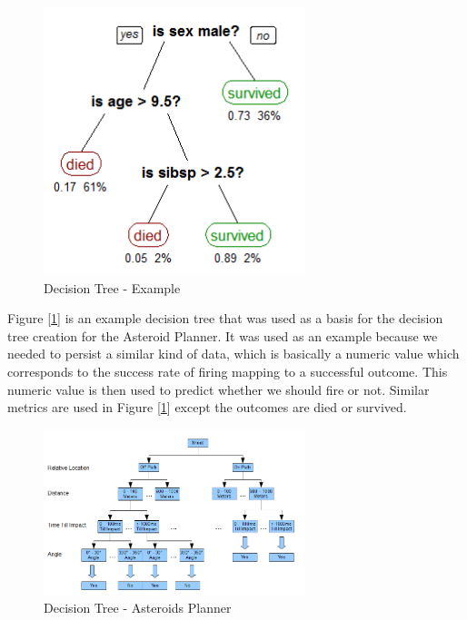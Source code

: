 \documentclass[10pt,draft,conference]{IEEEtran}
\begin{document}
\begin{figure}
\centering
\includegraphics[width=3.0in]{./CART_tree_titanic_survivors.png}
\caption{Decision Tree - Example}
\label{fig_decision_tree_example}
\end{figure}

Figure [\ref{fig_decision_tree_example}] is an example decision tree that was used as a basis for the decision tree creation for the Asteroid Planner\cite{wikiDecisionTreeLearning}.  It was used as an example because we needed to persist a similar kind of data, which is basically a numeric value which corresponds to the success rate of firing mapping to a successful outcome.  This numeric value is then used to predict whether we should fire or not.  Similar metrics are used in Figure [\ref{fig_decision_tree_example}] except the outcomes are died or survived.

\begin{figure}
\centering
\includegraphics[width=3.0in]{./DecisionTree.png}
\caption{Decision Tree - Asteroids Planner}
\label{fig_decision_tree_asteroids}
\end{figure}
\end{document}
